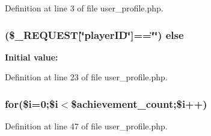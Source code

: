 Definition at line 3 of file user\+\_\+profile.\+php.

\hypertarget{user__profile_8php_ab95e1976f519b0bd6d0c0804bec3e258}{
\subsubsection[{else}]{ (\$\+\_\+\+R\+E\+Q\+U\+E\+S\+T\mbox{[}\char`\"{}player\+I\+D\char`\"{}\mbox{]}==\char`\"{}\char`\"{}) else}}\label{user__profile_8php_ab95e1976f519b0bd6d0c0804bec3e258}
{\bfseries Initial value\+:}


Definition at line 23 of file user\+\_\+profile.\+php.

\hypertarget{user__profile_8php_a5667e0f8c1d2529626a307f876afc97b}{
\subsubsection[{for}]{\setlength{\rightskip}{0pt plus 5cm}for(\$i=0;\$i$<$\$achievement\+\_\+count;\$i++)}}\label{user__profile_8php_a5667e0f8c1d2529626a307f876afc97b}


Definition at line 47 of file user\+\_\+profile.\+php.

